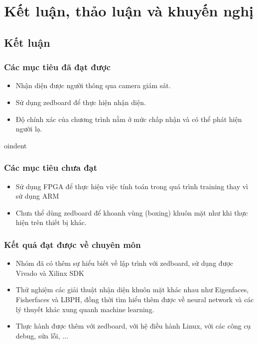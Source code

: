 \documentclass[a4paper]{report}
\begin{document}
\chapter{Kết luận, thảo luận và khuyến nghị}
\section{Kết luận}
\subsection{Các mục tiêu đã đạt được}
\begin{itemize}
\item Nhận diện được người thông qua camera giám sát.
\item Sử dụng zedboard để thực hiện nhận diện.
\item Độ chính xác của chương trình nằm ở mức chấp nhận và có thể phát hiện người lạ.
\end{itemize}
oindent
\subsection{Các mục tiêu chưa đạt}
\begin{itemize}
\item Sử dụng FPGA để thực hiện việc tính toán trong quá trình training thay vì sử dụng ARM
\item Chưa thể dùng zedboard để khoanh vùng (boxing) khuôn mặt như khi thực hiện trên thiết bị khác. 
\end{itemize}
\subsection{Kết quả đạt được về chuyên môn}
\begin{itemize}
\item Nhóm đã có thêm sự hiểu biết về lập trình với zedboard, sử dụng được Vivado và Xilinx SDK 
\item Thử nghiệm các giải thuật nhận diện khuôn mặt khác nhau như Eigenfaces, Fisherfaces và LBPH, đồng thời tìm hiểu thêm được về neural network và các lý thuyết khác xung quanh machine learning.
\item Thực hành được thêm với zedboard, với hệ điều hành Linux, với các công cụ debug, sửa lỗi, ...
\end{itemize}
\end{document}
